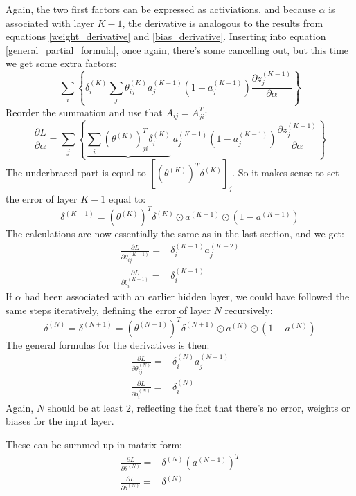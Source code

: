 \documentclass[12pt, a4paper]{article}
\numberwithin{equation}{section}
\begin{document}
Again, the two first factors can be expressed as activiations, and because $\alpha$ is associated with layer $K-1$, the derivative is analogous to the results from equations \ref{weight_derivative} and \ref{bias_derivative}. Inserting into equation \ref{general_partial_formula}, once again, there's some cancelling out, but this time we get some extra factors:
\begin{equation}
\sum_i\left\{\delta^{(K)}_i\sum_j\theta^{(K)}_{ij}a_j^{(K-1)}\left(1-a_j^{(K-1)}\right)\frac{\partial z^{(K-1)}_j}{\partial\alpha}\right\}
\end{equation}
Reorder the summation and use that $A_{ij}=A^T_{ji}$:
\begin{equation}
\frac{\partial L}{\partial\alpha}=\sum_{j}\left\{\underbrace{\sum_i\left(\theta^{(K)}\right)^T_{ji}\delta^{(K)}_i}\ a_j^{(K-1)}\left(1-a_j^{(K-1)}\right)\frac{\partial z^{(K-1)}_j}{\partial\alpha}\right\}
\end{equation}
The underbraced part is equal to $\left[\left(\theta^{(K)}\right)^T\delta^{(K)}\right]_j$. So it makes sense to set the error of layer $K-1$ equal to:
\begin{equation}
\delta^{(K-1)}=\left(\theta^{(K)}\right)^T\delta^{(K)}\odot a^{(K-1)}\odot\left(1-a^{(K-1)}\right)
\end{equation}
The calculations are now essentially the same as in the last section, and we get:
\begin{align}
\frac{\partial L}{\partial\theta^{(K-1)}_{ij}}=&\delta^{(K-1)}_i a^{(K-2)}_j\\
\frac{\partial L}{\partial b^{(K-1)}_i}=&\delta^{(K-1)}_i
\end{align}
If $\alpha$ had been associated with an earlier hidden layer, we could have followed the same steps iteratively, defining the error of layer $N$ recursively:
\begin{equation}
\delta^{(N)}=\delta^{(N+1)}=\left(\theta^{(N+1)}\right)^T\delta^{(N+1)}\odot a^{(N)}\odot\left(1-a^{(N)}\right)
\end{equation}
The general formulas for the derivatives is then:
\begin{align}
\frac{\partial L}{\partial\theta^{(N)}_{ij}}=&\delta^{(N)}_i a^{(N-1)}_j\\
\frac{\partial L}{\partial b^{(N)}_i}=&\delta^{(N)}_i
\end{align}
Again, $N$ should be at least 2, reflecting the fact that there's no error, weights or biases for the input layer.

These can be summed up in matrix form:
\begin{align}
\label{general_derivative}
\frac{\partial L}{\partial\theta^{(N)}}=&\delta^{(N)}\left(a^{(N-1)}\right)^T\\
\frac{\partial L}{\partial b^{(N)}}=&\delta^{(N)}
\end{align}
\end{document}

